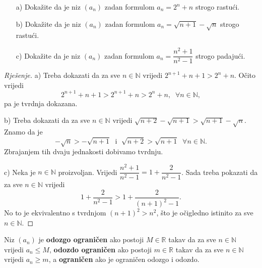 \begin{exercise}\textbf{}
\begin{itemize}
\item[a)] Dokažite da je niz $(a_n)$ zadan formulom $a_n=2^n+n$ strogo rastući.
\item[b)] Dokažite da je niz $(a_n)$ zadan formulom $a_n=\sqrt{n+1}-\sqrt{n}$ strogo rastući.
\item[c)] Dokažite da je niz $(a_n)$ zadan formulom $a_n=\dfrac{n^2+1}{n^2-1}$ strogo padajući.
\end{itemize}
\end{exercise}
\begin{proof}[Rješenje]
a) Treba dokazati da za sve $n\in \mathbb{N}$ vrijedi $2^{n+1}+n+1>2^n+n$. Očito vrijedi $$2^{n+1}+n+1>2^{n+1}+n>2^n+n, \;\;\forall n\in \mathbb{N},$$
pa je tvrdnja dokazana.

b) Treba dokazati da za sve $n\in \mathbb{N}$ vrijedi $\sqrt{n+2}-\sqrt{n+1}>\sqrt{n+1}-\sqrt{n}$. Znamo da je $$-\sqrt{n}>-\sqrt{n+1}\;\text{ i }\;\sqrt{n+2}>\sqrt{n+1}\;\;\forall n\in \mathbb{N}.$$ Zbrajanjem tih dvaju jednakosti dobivamo tvrdnju.

c) Neka je $n\in \mathbb{N}$ proizvoljan. Vrijedi $\dfrac{n^2+1}{n^2-1}=1+\dfrac{2}{n^2-1}$. Sada treba pokazati da za sve $n\in \mathbb{N}$ vrijedi 
$$1+\dfrac{2}{n^2-1}>1+\dfrac{2}{(n+1)^2-1}.$$
No to je ekvivalentno s tvrdnjom $(n+1)^2>n^2$, što je očigledno istinito za sve $n\in \mathbb{N}$.
\end{proof}

\begin{definition}
Niz $(a_n)$ je \textbf{odozgo ograničen} ako postoji $M\in \mathbb{R}$ takav da za sve $n\in \mathbb{N}$ vrijedi $a_n\leq M$, \textbf{odozdo ograničen} ako postoji $m\in \mathbb{R}$ takav da za sve $n\in \mathbb{N}$ vrijedi $a_n\geq m$, a \textbf{ograničen} ako je ograničen odozgo i odozdo.
\end{definition}

